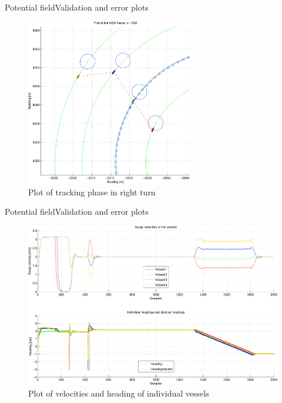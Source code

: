 \documentclass[10pt,handout]{beamer}
\begin{document}
\begin{frame}{Potential field}{Validation and error plots}
  \begin{figure}
    \includegraphics[width=0.65\textwidth]{img/pdfsvingstykke}
    \caption{Plot of tracking phase in right turn}
  \end{figure}
\end{frame}

\begin{frame}{Potential field}{Validation and error plots}
  \begin{figure}
    \includegraphics[width=\textwidth]{img/pdfveloghead}
    \caption{Plot of velocities and heading of individual vessels}
  \end{figure}
\end{frame}
\end{document}

